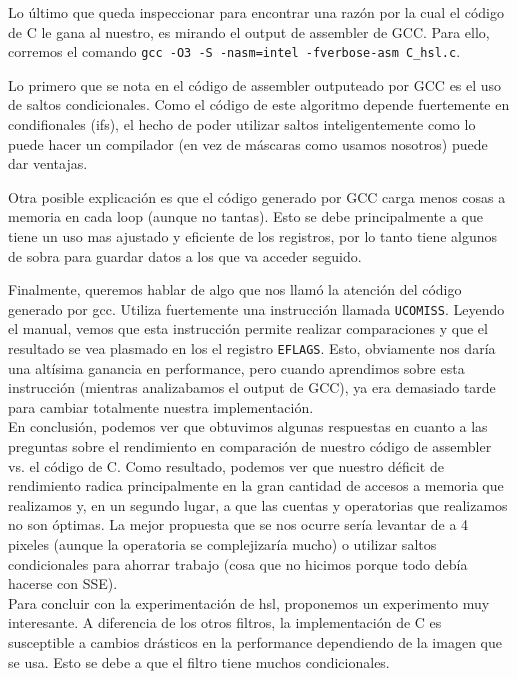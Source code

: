 Lo último que queda inspeccionar para encontrar una razón por la cual el código de C le gana al nuestro, es mirando el output de assembler de GCC. Para ello, corremos el comando \texttt{gcc -O3 -S -nasm=intel -fverbose-asm C\_hsl.c}.

Lo primero que se nota en el código de assembler outputeado por GCC es el uso de saltos condicionales. Como el código de este algoritmo depende fuertemente en condifionales (ifs), el hecho de poder utilizar saltos inteligentemente como lo puede hacer un compilador (en vez de máscaras como usamos nosotros) puede dar ventajas.

Otra posible explicación es que el código generado por GCC carga menos cosas a memoria en cada loop (aunque no tantas). Esto se debe principalmente a que tiene un uso mas ajustado y eficiente de los registros, por lo tanto tiene algunos de sobra para guardar datos a los que va acceder seguido.

Finalmente, queremos hablar de algo que nos llamó la atención del código generado por gcc. Utiliza fuertemente una instrucción llamada \texttt{UCOMISS}. Leyendo el manual, vemos que esta instrucción permite realizar comparaciones y que el resultado se vea plasmado en los el registro \texttt{EFLAGS}. Esto, obviamente nos daría una altísima ganancia en performance, pero cuando aprendimos sobre esta instrucción (mientras analizabamos el output de GCC), ya era demasiado tarde para cambiar totalmente nuestra implementación.
\\

En conclusión, podemos ver que obtuvimos algunas respuestas en cuanto a las preguntas sobre el rendimiento en comparación de nuestro código de assembler vs. el código de C. Como resultado, podemos ver que nuestro déficit de rendimiento radica principalmente en la gran cantidad de accesos a memoria que realizamos y, en un segundo lugar, a que las cuentas y operatorias que realizamos no son óptimas.
La mejor propuesta que se nos ocurre sería levantar de a 4 pixeles (aunque la operatoria se complejizaría mucho) o utilizar saltos condicionales para ahorrar trabajo (cosa que no hicimos porque todo debía hacerse con SSE).
\\

Para concluir con la experimentación de hsl, proponemos un experimento muy interesante. A diferencia de los otros filtros, la implementación de C es susceptible a cambios drásticos en la performance dependiendo de la imagen que se usa. Esto se debe a que el filtro tiene muchos condicionales.

